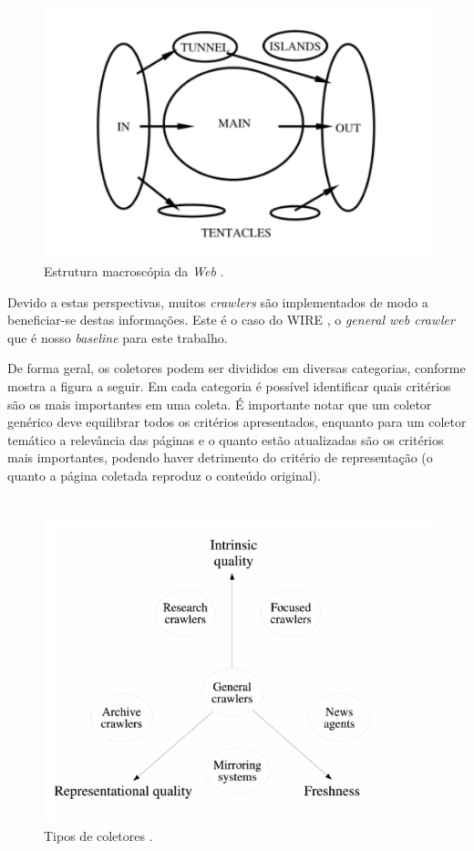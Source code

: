 \documentclass[a4paper,12pt,titlepage]{article}
\begin{document}
\begin{figure}[H]
     \centering
     \includegraphics[scale=0.5]{figures/macroscopic-structure-web.png}
     \caption{Estrutura macroscópia da \textit{Web} \cite{broder}.}
     \label{bsp}
\end{figure}

Devido a estas perspectivas, muitos \textit{crawlers} são implementados de modo a beneficiar-se destas informações. Este é o caso do WIRE \cite{carlos}, o \textit{general web crawler} que é nosso \textit{baseline} para este trabalho. 

De forma geral, os coletores podem ser divididos em diversas categorias, conforme mostra a figura a seguir. Em cada categoria é possível identificar quais critérios são os mais importantes em uma coleta. É importante notar que um coletor genérico deve equilibrar todos os critérios apresentados, enquanto para um coletor temático a relevância das páginas e o quanto estão atualizadas são os critérios mais importantes, podendo haver detrimento do critério de representação (o quanto a página coletada reproduz o conteúdo original). 
\\ \ 

\begin{figure}[H]
     \centering
     \includegraphics[scale=0.4]{figures/crawlers-types.png}
     \caption{Tipos de coletores \cite{carlos}.}
     \label{bsp}
\end{figure}
\end{document}
